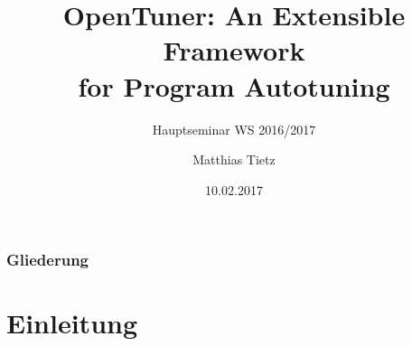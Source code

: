 
\usepackage[utf8]{inputenc}
\usepackage{babel}
\usepackage{floatflt}
\usepackage{float}
\usepackage{graphics}
\usepackage{listings}
\usepackage{color}


%
%

\title{OpenTuner: An Extensible Framework \\ for Program Autotuning}
\subtitle{Hauptseminar WS 2016/2017}
\author{Matthias Tietz}

\date{10.02.2017}
\institute[TUC]



    \tucthreeheadlines
    
    \begin{frame}
      \titlepage
    \end{frame}

    \begin{frame}

       \frametitle{Gliederung}
       \tableofcontents

    \end{frame}


    \tuctwoheadlines

    

    \section{Einleitung}


